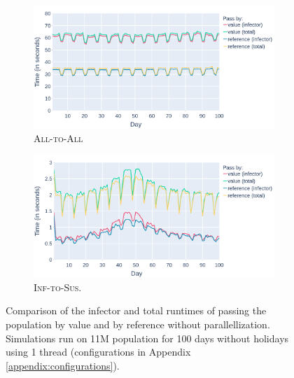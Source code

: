 \begin{figure}
    \centering
    \begin{subfigure}[b]{\linewidth}
        \centering
        \includegraphics[width=\linewidth]{3 - Stride/fig/basis_standard_comparison_all.png}
        \caption{\textsc{All-to-All}}
        \label{fig:basis_standard_comparison_all}
    \end{subfigure}
    \begin{subfigure}[b]{\linewidth}
        \centering
        \includegraphics[width=\linewidth]{3 - Stride/fig/basis_standard_comparison_opt.png}
        \caption{\textsc{Inf-to-Sus}.}
        \label{fig:basis_standard_comparison_opt}
    \end{subfigure}
    \caption{Comparison of the infector and total runtimes of passing the population by value and by reference without parallellization. Simulations run on 11M population for 100 days without holidays using 1 thread (configurations in Appendix \ref{appendix:configurations}).}
    \label{fig:basis_standard_comparison}
\end{figure}

